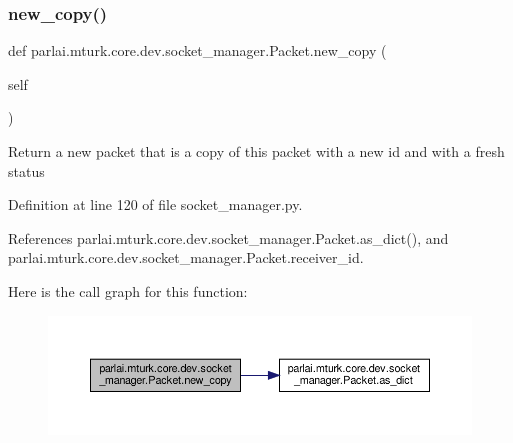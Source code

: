 \mbox{\label{classparlai_1_1mturk_1_1core_1_1dev_1_1socket__manager_1_1Packet_adde61fc0d58a62c2446fe8ea54adb02e}} 
\subsubsection{\texorpdfstring{new\+\_\+copy()}{new\_copy()}}
{\footnotesize\ttfamily def parlai.\+mturk.\+core.\+dev.\+socket\+\_\+manager.\+Packet.\+new\+\_\+copy (\begin{DoxyParamCaption}\item[{}]{self }\end{DoxyParamCaption})}

\begin{DoxyVerb}Return a new packet that is a copy of this packet with
a new id and with a fresh status
\end{DoxyVerb}
 

Definition at line 120 of file socket\+\_\+manager.\+py.



References parlai.\+mturk.\+core.\+dev.\+socket\+\_\+manager.\+Packet.\+as\+\_\+dict(), and parlai.\+mturk.\+core.\+dev.\+socket\+\_\+manager.\+Packet.\+receiver\+\_\+id.

Here is the call graph for this function\+:
\nopagebreak
\begin{figure}[H]
\begin{center}
\leavevmode
\includegraphics[width=350pt]{classparlai_1_1mturk_1_1core_1_1dev_1_1socket__manager_1_1Packet_adde61fc0d58a62c2446fe8ea54adb02e_cgraph}
\end{center}
\end{figure}
\mbox{\label{classparlai_1_1mturk_1_1core_1_1dev_1_1socket__manager_1_1Packet_a73e956631f9f7da69ec03301147f8517}} 

